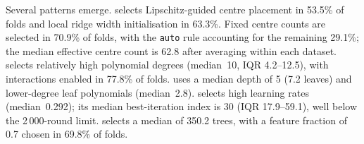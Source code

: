 Several patterns emerge.
 selects Lipschitz-guided centre placement in 53.5\% of folds and local ridge width initialisation in 63.3\%.
Fixed centre counts are selected in 70.9\% of folds, with the \texttt{auto} rule accounting for the remaining 29.1\%; the median effective centre count is 62.8 after averaging within each dataset.
 selects relatively high polynomial degrees (median~10, IQR 4.2--12.5), with interactions enabled in 77.8\% of folds.
 uses a median depth of 5 (7.2 leaves) and lower-degree leaf polynomials (median~2.8).
 selects high learning rates (median~0.292); its median best-iteration index is 30 (IQR 17.9--59.1), well below the 2\,000-round limit.
 selects a median of 350.2 trees, with a feature fraction of 0.7 chosen in 69.8\% of folds.




